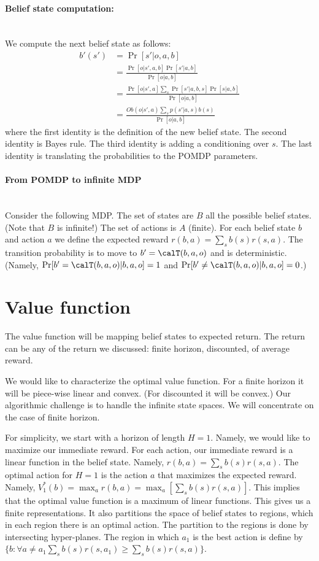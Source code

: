 \paragraph{Belief state computation:}\ \\
We compute the next belief state as follows:
\begin{align*}
b'(s') &= \Pr[s'|o,a,b]\\
&= \frac{\Pr[o|s',a,b]\Pr[s'|a,b]}{\Pr[o|a,b]}\\
&= \frac{\Pr[o|s',a]\sum_s \Pr[s'|a,b,s]\Pr[s|a,b]}{\Pr[o|a,b]}\\
&= \frac{Ob(o|s',a)\sum_s p(s'|a,s)b(s)}{\Pr[o|a,b]}
\end{align*}
where the first identity is the definition of the new belief state.
The second identity is Bayes rule. The third identity is adding a
conditioning over $s$. The last identity is translating the
probabilities to the POMDP parameters.

\paragraph{From POMDP to infinite MDP}\ \\
Consider the following MDP. The set of states are $B$ all the
possible belief states. (Note that $B$ is infinite!) The set of
actions is $A$ (finite). For each belief state $b$ and action $a$ we
define the expected reward $r(b,a)=\sum_s b(s)r(s,a)$. The
transition probability is to move to $b'=\calT(b,a,o)$ and is
deterministic. (Namely, $\Pr[b'=\calT(b,a,o)|b,a,o]=1$ and
$\Pr[b'\neq \calT(b,a,o)|b,a,o]=0$.)


\section{Value function}
The value function will be mapping belief states to expected return.
The return can be any of the return we discussed: finite horizon,
discounted, of average reward.

We would like to characterize the optimal value function. For a
finite horizon it will be piece-wise linear and convex. (For
discounted it will be convex.) Our algorithmic challenge is to
handle the infinite state spaces. We will concentrate on the case of
finite horizon.

For simplicity, we start with a horizon of length $H=1$. Namely, we
would like to maximize our immediate reward. For each action, our
immediate reward is a linear function in the belief state. Namely,
$r(b,a)=\sum_s b(s)r(s,a)$. The optimal action for $H=1$ is the
action $a$ that maximizes the expected reward. Namely,
$V^*_1(b)=\max_a r(b,a)=\max_a [\sum_s b(s)r(s,a)]$. This implies
that the optimal value function is a maximum of linear functions.
This gives us a finite representations. It also partitions the space
of belief states to regions, which in each region there is an
optimal action. The partition to the regions is done by intersecting
hyper-planes. The region in which $a_1$ is the best action is define
by $\{b: \forall a\neq a_1 \sum_s b(s)r(s,a_1)\geq \sum_s
b(s)r(s,a)\}$.

